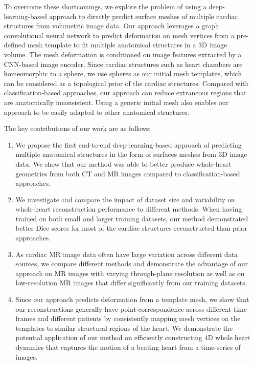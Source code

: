 \documentclass[times,review,preprint,authoryear]{elsarticle}
\begin{document}
To overcome these shortcomings, we explore the problem of using a deep-learning-based approach to directly predict surface meshes of multiple cardiac structures from volumetric image data. Our approach leverages a graph convolutional neural network to predict deformation on mesh vertices from a pre-defined mesh template to fit multiple anatomical structures in a 3D image volume. The mesh deformation is conditioned on image features extracted by a CNN-based image encoder. Since cardiac structures such as heart chambers are \textcolor{black}{homeomorphic} to a sphere, we use spheres as our initial mesh templates, which can be considered as a topological prior of the cardiac structures. Compared with classification-based approaches, our approach can reduce extraneous regions that are anatomically inconsistent. Using a generic initial mesh also enables our approach to be easily adapted to other anatomical structures.  

The key contributions of our work are as follows:  
\begin{enumerate}
    \item We propose the first end-to-end deep-learning-based approach of predicting multiple anatomical structures in the form of surfaces meshes from 3D image data. We show that our method was able to better produce whole-heart geometries from both CT and MR images compared to classification-based approaches. 
    \item We investigate and compare the impact of dataset size and variability on whole-heart reconstruction performance to different methods. When having trained on both small and larger training datasets, our method demonstrated better Dice scores for most of the cardiac structures reconstructed than prior approaches. 
    \item As cardiac MR image data often have large variation across different data sources, we compare different methods and demonstrate the advantage of our approach on MR images with varying through-plane resolution as well as on low-resolution MR images that differ significantly from our training datasets.
    \item Since our approach predicts deformation from a template mesh, we show that our reconstructions generally have point correspondence across different time frames and different patients by consistently mapping mesh vertices on the templates to similar structural regions of the heart. We demonstrate the potential application of our method on efficiently constructing 4D whole heart dynamics that captures the motion of a beating heart from a time-series of images. 
\end{enumerate}
\end{document}
